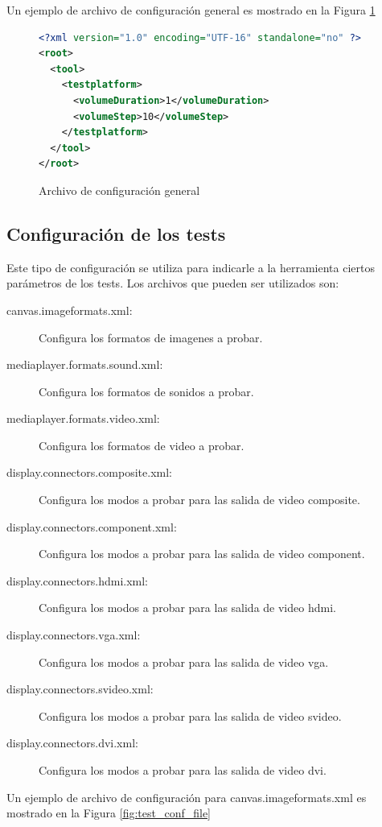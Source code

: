 \documentclass{article}
\begin{document}
Un ejemplo de archivo de configuración general es mostrado en la Figura \ref{fig:general_conf_file}

\begin{figure}[h]
\centering
\begin{lstlisting}[language=xml]
<?xml version="1.0" encoding="UTF-16" standalone="no" ?>
<root>
  <tool>
    <testplatform>
      <volumeDuration>1</volumeDuration>
      <volumeStep>10</volumeStep>
    </testplatform>
  </tool>
</root>
\end{lstlisting}
\caption{Archivo de configuración general}
\label{fig:general_conf_file}
\end{figure}

\subsection{Configuración de los tests}
Este tipo de configuración se utiliza para indicarle a la herramienta ciertos parámetros de los tests. Los archivos que pueden ser utilizados son:

\begin{description}
  \item[canvas.imageformats.xml:] Configura los formatos de imagenes a probar.
  \item[mediaplayer.formats.sound.xml:] Configura los formatos de sonidos a probar.
  \item[mediaplayer.formats.video.xml:] Configura los formatos de video a probar.
  \item[display.connectors.composite.xml:] Configura los modos a probar para las salida de video composite.
  \item[display.connectors.component.xml:] Configura los modos a probar para las salida de video component.
  \item[display.connectors.hdmi.xml:] Configura los modos a probar para las salida de video hdmi.
  \item[display.connectors.vga.xml:] Configura los modos a probar para las salida de video vga.
  \item[display.connectors.svideo.xml:] Configura los modos a probar para las salida de video svideo.
  \item[display.connectors.dvi.xml:] Configura los modos a probar para las salida de video dvi.
\end{description}

Un ejemplo de archivo de configuración para canvas.imageformats.xml es mostrado en la Figura \ref{fig:test_conf_file}
\end{document}
